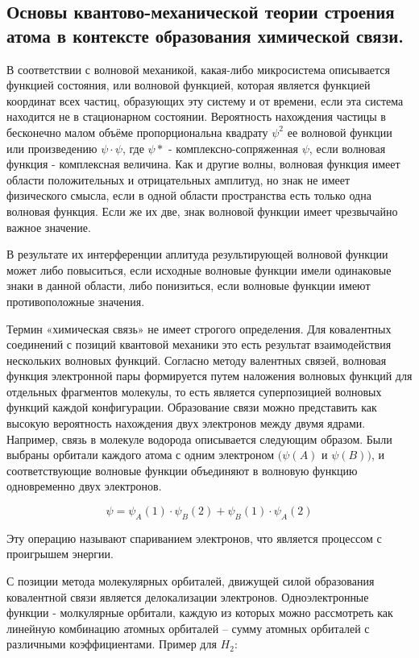 
\subsection{Основы квантово-механической теории строения атома в контексте образования химической связи.}

 В соответствии с волновой механикой, какая-либо микросистема
описывается функцией состояния, или волновой функцией, которая
является функцией координат всех частиц, образующих эту систему
и от времени, если эта система находится не в стационарном
состоянии. Вероятность нахождения частицы в бесконечно малом
объёме пропорциональна квадрату $\psi^2$ ее волновой функции или
произведению $\psi\cdot\psi$, где $\psi*$ - комплексно-сопряженная $\psi$, если
волновая функция - комплексная величина. Как и другие волны,
волновая функция имеет области положительных и отрицательных
амплитуд, но знак не имеет физического смысла, если в одной
области пространства есть только одна волновая функция. Если же
их две, знак волновой функции имеет чрезвычайно важное
значение.

В результате их интерференции аплитуда
результирующей волновой функции может либо повыситься, если
исходные волновые функции имели одинаковые знаки в данной
области, либо понизиться, если волновые функции имеют
противоположные значения.

Термин «химическая связь» не имеет строгого определения. Для
ковалентных соединений с позиций квантовой механики это есть
результат взаимодействия нескольких волновых функций. Согласно
методу валентных связей, волновая функция электронной пары
формируется путем наложения волновых функций для отдельных
фрагментов молекулы, то есть является суперпозицией волновых
функций каждой конфигурации. Образование связи можно
представить как высокую вероятность нахождения двух электронов
между двумя ядрами. Например, связь в молекуле водорода
описывается следующим образом. Были выбраны орбитали
каждого атома с одним электроном $(\psi(A)$ и $\psi(B))$, и
соответствующие волновые функции объединяют в волновую
функцию одновременно двух электронов.

$$\psi = \psi_A(1)\cdot\psi_B(2) + \psi_B(1)\cdot\psi_A(2)$$

Эту операцию называют спариванием электронов, что является процессом с проигрышем энергии.

С позиции метода молекулярных орбиталей, движущей силой образования ковалентной связи является делокализации электронов. Одноэлектронные функции - молкулярные орбитали, каждую из которых можно рассмотреть как линейную комбинацию атомных орбиталей -- сумму атомных орбиталей с различными коэффициентами. Пример для $H_2$:

